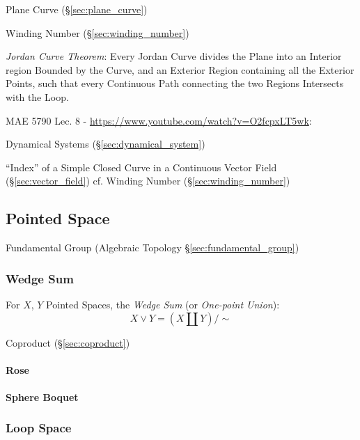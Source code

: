 \fist Plane Curve (\S\ref{sec:plane_curve})

Winding Number (\S\ref{sec:winding_number})

\emph{Jordan Curve Theorem}: Every Jordan Curve divides the Plane into an
Interior region Bounded by the Curve, and an Exterior Region containing all the
Exterior Points, such that every Continuous Path connecting the two Regions
Intersects with the Loop.


MAE 5790 Lec. 8 - \url{https://www.youtube.com/watch?v=O2fcpxLT5wk}:

\fist Dynamical Systems (\S\ref{sec:dynamical_system})

``Index'' of a Simple Closed Curve in a Continuous Vector Field
(\S\ref{sec:vector_field}) \fist cf. Winding Number
(\S\ref{sec:winding_number})



\subsection{Pointed Space}\label{sec:pointed_space}

\fist Fundamental Group (Algebraic Topology \S\ref{sec:fundamental_group})



\subsubsection{Wedge Sum}\label{sec:wedge_sum}

For $X$, $Y$ Pointed Spaces, the \emph{Wedge Sum} (or \emph{One-point
  Union}):
\[
  X \vee Y = (X \amalg Y) / \sim
\]

Coproduct (\S\ref{sec:coproduct})



\paragraph{Rose}\label{sec:rose}\hfill

\paragraph{Sphere Boquet}\label{sec:sphere_boquet}\hfill



\subsubsection{Loop Space}\label{sec:loop_space}

